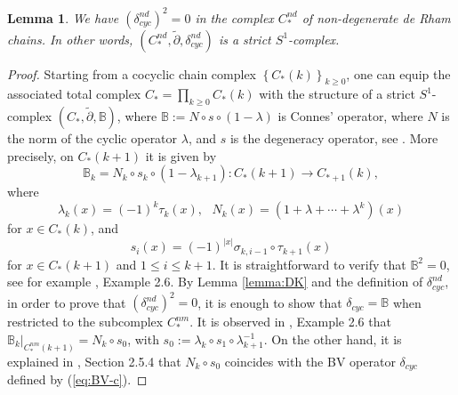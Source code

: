 \documentclass[a4paper]{article}
\newtheorem{lemma}[theorem]{Lemma}
\numberwithin{equation}{section}
\begin{document}
\begin{lemma}\label{lemma:strict}
We have $(\delta_\mathit{cyc}^\mathit{nd})^2=0$ in the complex $C_\ast^\mathit{nd}$ of non-degenerate de Rham chains. In other words, $(C_\ast^\mathit{nd},\tilde{\partial},\delta_\mathit{cyc}^\mathit{nd})$ is a strict $S^1$-complex.
\end{lemma}
\begin{proof}
Starting from a cocyclic chain complex $\left\{C_\ast(k)\right\}_{k\geq0}$, one can equip the associated total complex $C_\ast=\prod_{k\geq0}C_\ast(k)$ with the structure of a strict $S^1$-complex $(C_\ast,\tilde{\partial},\mathbb{B})$, where $\mathbb{B}:=N\circ s\circ(1-\lambda)$ is Connes' operator, where $N$ is the norm of the cyclic operator $\lambda$, and $s$ is the degeneracy operator, see \cite{jl}. More precisely, on $C_\ast(k+1)$ it is given by
\begin{equation}
\mathbb{B}_k=N_k\circ s_k\circ (1-\lambda_{k+1}):C_\ast(k+1)\rightarrow C_{\ast+1}(k),
\end{equation}
where
\begin{equation}
\lambda_k(x)=(-1)^k\tau_k(x),\textrm{ }N_k(x)=(1+\lambda+\cdots+\lambda^k)(x)
\end{equation}
for $x\in C_\ast(k)$, and
\begin{equation}
s_i(x)=(-1)^{|x|}\sigma_{k,i-1}\circ\tau_{k+1}(x)
\end{equation}
for $x\in C_\ast(k+1)$ and $1\leq i\leq k+1$. It is straightforward to verify that $\mathbb{B}^2=0$, see for example \cite{yw}, Example 2.6. By Lemma \ref{lemma:DK} and the definition of $\delta_\mathit{cyc}^\mathit{nd}$, in order to prove that $(\delta_\mathit{cyc}^\mathit{nd})^2=0$, it is enough to show that $\delta_\mathit{cyc}=\mathbb{B}$ when restricted to the subcomplex $C_\ast^\mathit{nm}$. It is observed in \cite{yw}, Example 2.6 that $\mathbb{B}_k|_{C_\ast^\mathit{nm}(k+1)}=N_k\circ s_0$, with $s_0:=\lambda_k\circ s_1\circ\lambda_{k+1}^{-1}$. On the other hand, it is explained in \cite{ki1}, Section 2.5.4 that $N_k\circ s_0$ coincides with the BV operator $\delta_\mathit{cyc}$ defined by (\ref{eq:BV-c}).
\end{proof}
\end{document}

